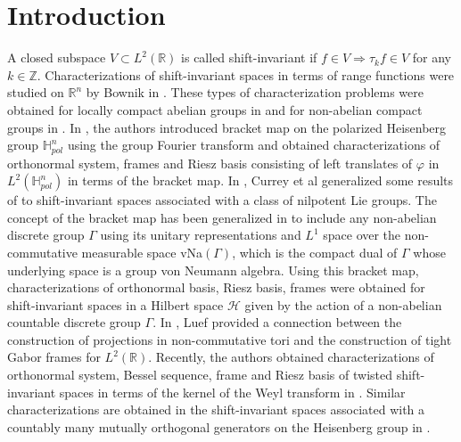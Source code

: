 \documentclass[a4paper,12pt,reqno]{amsart}
\theoremstyle{plain}
\numberwithin{equation}{section}
\theoremstyle{definition}
\newcounter {own}
\begin{document}
\section{Introduction}
A closed subspace $V\subset L^{2}(\mathbb{R})$ is called shift-invariant if $f\in V\Longrightarrow \tau_{k}f\in V$ for any $k\in \mathbb{Z}$. Characterizations of shift-invariant spaces in terms of range functions were studied on $\mathbb{R}^{n}$ by Bownik in \cite{bo}. These types of characterization problems were obtained for locally compact abelian groups in \cite{cab,kgr} and for non-abelian compact groups in \cite{rad}. In \cite{bhm}, the authors introduced bracket map on the polarized Heisenberg group $\mathbb{H}_{pol}^{n}$ using the group Fourier transform and obtained characterizations of orthonormal system, frames and Riesz basis consisting of left translates of $\varphi$ in $L^{2}(\mathbb{H}_{pol}^{n})$ in terms of the bracket map. In \cite{cmo}, Currey et al generalized some results of \cite{bo} to shift-invariant spaces associated with a class of nilpotent Lie groups. The concept of the bracket map has been generalized in \cite{bhp} to include any non-abelian discrete group $\Gamma$ using its unitary representations and $L^{1}$ space over the non-commutative measurable space vNa$(\Gamma)$, which is the compact dual of $\Gamma$ whose underlying space is a group von Neumann algebra. Using this bracket map, characterizations of orthonormal basis, Riesz basis, frames were obtained for shift-invariant spaces in a Hilbert space $\mathcal{H}$ given by the action of a non-abelian countable discrete group $\Gamma$. In \cite{lf}, Luef provided a connection between the construction of projections in non-commutative tori and the construction of tight Gabor frames for $L^{2}(\mathbb{R})$. Recently, the authors obtained characterizations of orthonormal system, Bessel sequence, frame and Riesz basis of twisted shift-invariant spaces in terms of the kernel of the Weyl transform in \cite{ras}. Similar characterizations are obtained in the shift-invariant spaces associated with a countably many mutually orthogonal generators on the Heisenberg group in \cite{ra}.
\end{document}
